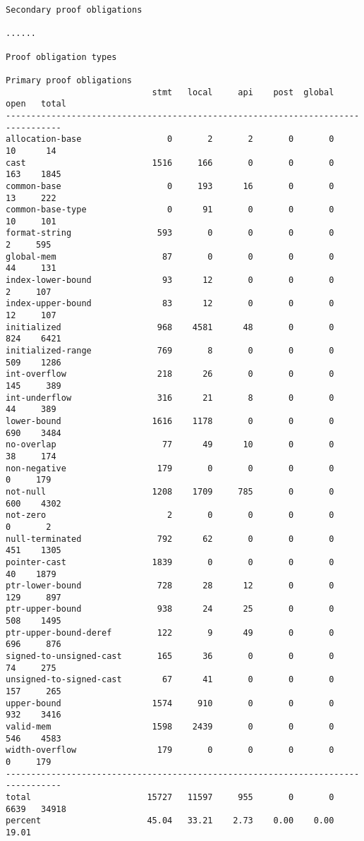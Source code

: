 \documentclass[11pt]{article}
\begin{document}
\begin{small}
\begin{verbatim}
Secondary proof obligations

......

Proof obligation types

Primary proof obligations
                             stmt   local     api    post  global    open   total
---------------------------------------------------------------------------------
allocation-base                 0       2       2       0       0      10      14
cast                         1516     166       0       0       0     163    1845
common-base                     0     193      16       0       0      13     222
common-base-type                0      91       0       0       0      10     101
format-string                 593       0       0       0       0       2     595
global-mem                     87       0       0       0       0      44     131
index-lower-bound              93      12       0       0       0       2     107
index-upper-bound              83      12       0       0       0      12     107
initialized                   968    4581      48       0       0     824    6421
initialized-range             769       8       0       0       0     509    1286
int-overflow                  218      26       0       0       0     145     389
int-underflow                 316      21       8       0       0      44     389
lower-bound                  1616    1178       0       0       0     690    3484
no-overlap                     77      49      10       0       0      38     174
non-negative                  179       0       0       0       0       0     179
not-null                     1208    1709     785       0       0     600    4302
not-zero                        2       0       0       0       0       0       2
null-terminated               792      62       0       0       0     451    1305
pointer-cast                 1839       0       0       0       0      40    1879
ptr-lower-bound               728      28      12       0       0     129     897
ptr-upper-bound               938      24      25       0       0     508    1495
ptr-upper-bound-deref         122       9      49       0       0     696     876
signed-to-unsigned-cast       165      36       0       0       0      74     275
unsigned-to-signed-cast        67      41       0       0       0     157     265
upper-bound                  1574     910       0       0       0     932    3416
valid-mem                    1598    2439       0       0       0     546    4583
width-overflow                179       0       0       0       0       0     179
---------------------------------------------------------------------------------
total                       15727   11597     955       0       0    6639   34918
percent                     45.04   33.21    2.73    0.00    0.00   19.01


\end{verbatim}
\end{small}
\end{document}
